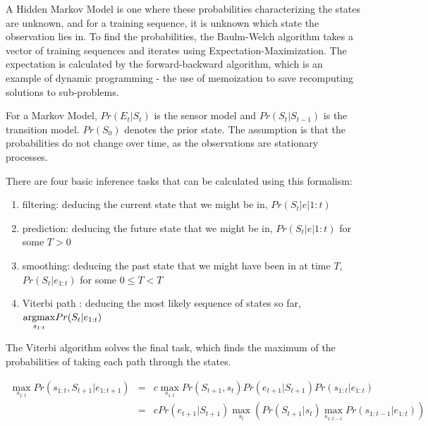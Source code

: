 \documentclass[12pt,a4,notitlepage]{report}
\renewcommand{\_}{\texttt{\symbol{95}}}
\newcommand{\<}{\texttt{\symbol{60}}}
\renewcommand{\>}{\texttt{\symbol{62}}}
\begin{document}
A Hidden Markov Model is one where these probabilities characterizing the states are unknown, and for a training sequence, it is unknown which state the observation lies in. To find the probabilities, the Baulm-Welch algorithm takes a vector of training sequences and iterates using Expectation-Maximization. The expectation is calculated by the forward-backward algorithm, which is an example of dynamic programming - the use of memoization to save recomputing solutions to sub-problems.

For a Markov Model, $Pr(E_t|S_t)$ is the sensor model and $Pr(S_t|S_{t-1})$ is the transition model. $Pr(S_0)$ denotes the prior state.\cite{AIModern} The assumption is that the probabilities do not change over time, as the observations are stationary processes.

There are four basic inference tasks that can be calculated using this formalism:

\begin{enumerate}
\item filtering: deducing the current state that we might be in, $Pr(S_t|e|{1:t})$
\item prediction: deducing the future state that we might be in, $Pr(S_t|e|{1:t})$ for some $T>0$
\item smoothing: deducing the past state that we might have been in at time $T$, $Pr(S_t|e_{1:t})$ for some $0 \le T < T$
\item Viterbi path : deducing the most likely sequence of states so far, $\underset{s_{1:t}}{\operatornamewithlimits{argmax}}Pr(S_t|e_{1:t})$
\end{enumerate}

The Viterbi algorithm solves the final task, which finds the maximum of the probabilities of taking each path through the states.

\begin{eqnarray*}
\max_{s_{1:t}} Pr(s_{1:t},S_{t+1}|e_{1:t+1}) &=& c \max_{s_{1:t}} Pr(S_{t+1},s_t) Pr(e_{t+1}|S_{t+1}) Pr(s_{1:t}|e_{1:t}) \\
 &=& c Pr (e_{t+1}|S_{t+1}) \max_{s_t}\left( Pr(S_{t+1}|s_t) \max_{s_{1:t-1}} Pr(s_{1:t-1}|e_{1:t}) \right) \\
\end{eqnarray*}
\end{document}
